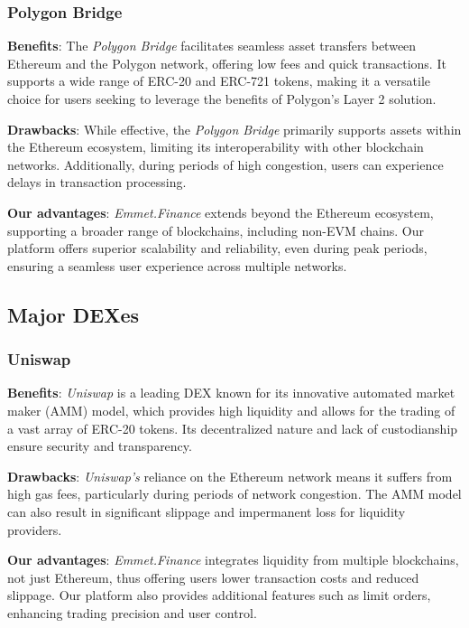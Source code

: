 \documentclass[12pt, a4paper]{article}
\begin{document}
\subsubsection{Polygon Bridge}

\textbf{Benefits}: The \textit{Polygon Bridge} facilitates seamless asset transfers between Ethereum and the Polygon network, offering low fees and quick transactions. It supports a wide range of ERC-20 and ERC-721 tokens, making it a versatile choice for users seeking to leverage the benefits of Polygon's Layer 2 solution.

\textbf{Drawbacks}: While effective, the \textit{Polygon Bridge} primarily supports assets within the Ethereum ecosystem, limiting its interoperability with other blockchain networks. Additionally, during periods of high congestion, users can experience delays in transaction processing.

\textbf{Our advantages}: \textit{Emmet.Finance} extends beyond the Ethereum ecosystem, supporting a broader range of blockchains, including non-EVM chains. Our platform offers superior scalability and reliability, even during peak periods, ensuring a seamless user experience across multiple networks.

\subsection{Major DEXes}

\subsubsection{Uniswap}

\textbf{Benefits}: \textit{Uniswap} is a leading DEX known for its innovative automated market maker (AMM) model, which provides high liquidity and allows for the trading of a vast array of ERC-20 tokens. Its decentralized nature and lack of custodianship ensure security and transparency.

\textbf{Drawbacks}: \textit{Uniswap's} reliance on the Ethereum network means it suffers from high gas fees, particularly during periods of network congestion. The AMM model can also result in significant slippage and impermanent loss for liquidity providers.

\textbf{Our advantages}: \textit{Emmet.Finance} integrates liquidity from multiple blockchains, not just Ethereum, thus offering users lower transaction costs and reduced slippage. Our platform also provides additional features such as limit orders, enhancing trading precision and user control.
\end{document}
